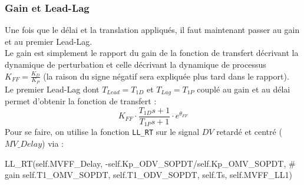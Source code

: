 \subsubsection{Gain et Lead-Lag}
Une fois que le délai et la translation appliqués, il faut maintenant passer au gain et au premier Lead-Lag.
\\Le gain est simplement le rapport du gain de la fonction de transfert décrivant la dynamique de perturbation et celle décrivant la dynamique de processus $K_{FF} = \frac{K_D}{K_P}$ (la raison du signe négatif sera expliquée plus tard dans le rapport).
\\Le premier Lead-Lag dont $T_{Lead} = T_{1D}$ et $T_{Lag} = T_{1P}$ couplé au gain et au délai permet d'obtenir la fonction de transfert : 
\[K_{FF}\cdot\frac{T_{1D}s + 1}{T_{1P}s + 1} \cdot e^{\theta_{FF}}\]
Pour se faire, on utilise la fonction \texttt{LL\_RT} sur le signal $DV$ retardé et centré ($MV\_Delay$) via : 
\begin{python*}
	LL_RT(self.MVFF_Delay, 
	-self.Kp_ODV_SOPDT/self.Kp_OMV_SOPDT, # gain
	self.T1_OMV_SOPDT, 
	self.T1_ODV_SOPDT, 
	self.Ts, 
	self.MVFF_LL1)
\end{python*}




